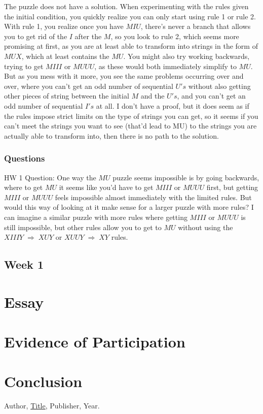 \documentclass{article}
\theoremstyle{plain}
\theoremstyle{definition}
\theoremstyle{remark}
\begin{document}
The puzzle does not have a solution.  When experimenting with the rules given the initial condition, you
quickly realize you can only start using rule 1 or rule 2.  With rule 1, you realize once you have $MIU$, there's 
never a branch that allows you to get rid of the $I$ after the $M$, so you look to rule 2, which seems more promising
at first, as you are at least able to transform into strings in the form of $MUX$, which at least contains the $MU$. You might
also try working backwards, trying to get $MIII$ or $MUUU$, as these would both immediately simplify to $MU$. But as
you mess with it more, you see the same problems occurring over and over, where you can't get an odd number of sequential $U's$ without also getting other pieces of string 
between the initial $M$ and the $U's$, and you can't get an odd number of sequential $I's$ at all.  I don't have a proof, but it does seem
as if the rules impose strict limits on the type of strings you can get, so it seems if you can't meet the strings you want to see (that'd lead to MU)
to the strings you are actually able to transform into, then there is no path to the solution.



\subsubsection{Questions}

HW 1 Question: One way the $MU$ puzzle seems impossible is by going backwards, where to get $MU$ it seems like 
you'd have to get $MIII$ or $MUUU$ first, but getting $MIII$ or $MUUU$ feels impossible almost immediately with
the limited rules.  But would this way of looking at it make sense for a larger puzzle with more rules? 
I can imagine a similar puzzle with more rules where getting $MIII$ or $MUUU$ is still 
impossible, but other rules allow you to get to $MU$ without using the $XIIIY \;\Rightarrow\; XUY$ or $XUUY \;\Rightarrow\; XY$ rules.

\subsection{Week 1}

\section{Essay}

\section{Evidence of Participation}

\section{Conclusion}\label{conclusion}

\begin{thebibliography}{99}
 Author, \href{https://en.wikipedia.org/wiki/LaTeX}{Title}, Publisher, Year.
\end{thebibliography}
\end{document}
